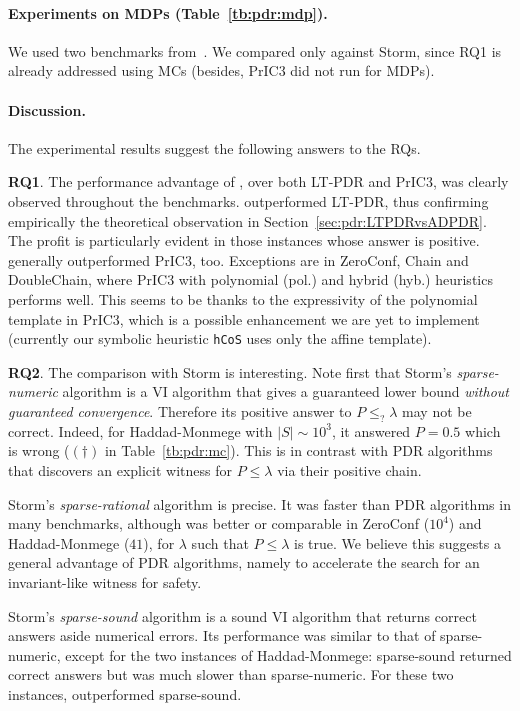 \paragraph{Experiments on MDPs (Table~\ref{tb:pdr:mdp}).}
We used two benchmarks from~\cite{HKPQR19}. We compared \ADPDR only against Storm, since RQ1 is already addressed using MCs (besides, PrIC3 did not run for MDPs).

\paragraph{Discussion.}
The experimental results suggest the following answers to the RQs.

\textbf{RQ1}.
The performance advantage of \ADPDR{}, over both LT-PDR and PrIC3, was clearly observed throughout the benchmarks.
\ADPDR{} outperformed LT-PDR, thus confirming empirically the theoretical observation in Section~\ref{sec:pdr:LTPDRvsADPDR}. The profit is particularly evident in those instances whose answer is positive.
\ADPDR{} generally outperformed PrIC3, too.
Exceptions are in ZeroConf, Chain and DoubleChain, where PrIC3 with  polynomial (pol.) and hybrid (hyb.) heuristics performs well. This seems to be thanks to the expressivity of the polynomial template in PrIC3, which is a possible enhancement we are yet to implement (currently our symbolic heuristic \verb|hCoS| uses only the affine template).

\textbf{RQ2}.
The comparison with Storm is interesting. Note first that Storm's \emph{sparse-numeric} algorithm is a VI algorithm that gives a guaranteed lower bound \emph{without guaranteed convergence}. Therefore  its positive answer to $P\le_{?}\lambda$ may not be correct. Indeed, for Haddad-Monmege with $|S|\sim 10^{3}$, it answered $P=0.5$ which is wrong ($(\dagger)$ in Table~\ref{tb:pdr:mc}). This is in contrast with PDR algorithms that discovers an explicit witness for  $P\le\lambda$ via their positive chain.

Storm's \emph{sparse-rational} algorithm is precise.
It was faster than PDR algorithms in many benchmarks, although \ADPDR was better or comparable in ZeroConf ($10^4$) and Haddad-Monmege ($41$), for $\lambda$ such that $P\le\lambda$ is true. We believe this suggests a general advantage of PDR algorithms, namely to accelerate the search for an invariant-like witness for safety.

Storm's \emph{sparse-sound} algorithm is a sound VI algorithm that returns correct answers aside numerical errors.
Its performance was similar to that of sparse-numeric, except for the two instances of Haddad-Monmege: sparse-sound returned correct answers but was much slower than sparse-numeric.
For these two instances, \ADPDR{} outperformed sparse-sound.

